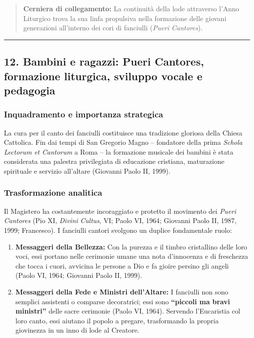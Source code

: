 \documentclass[12pt,a4paper]{article}
\begin{document}
	\begin{quote}
		\textbf{Cerniera di collegamento:} La continuità della lode attraverso l'Anno Liturgico trova la sua linfa propulsiva nella formazione delle giovani generazioni all'interno dei cori di fanciulli (\emph{Pueri Cantores}).
	\end{quote}
	
	\begin{center}\rule{0.5\linewidth}{0.5pt}\end{center}
	
	\subsection{12. Bambini e ragazzi: Pueri Cantores, formazione liturgica, sviluppo vocale e pedagogia}\label{bambini-e-ragazzi-pueri-cantores-formazione-liturgica-sviluppo-vocale-e-pedagogia}
	
	\subsubsection{Inquadramento e importanza strategica}\label{inquadramento-e-importanza-strategica-10}
	
	La cura per il canto dei fanciulli costituisce una tradizione gloriosa della Chiesa Cattolica. Fin dai tempi di San Gregorio Magno -- fondatore della prima \emph{Schola Lectorum et Cantorum} a Roma -- la formazione musicale dei bambini è stata considerata una palestra privilegiata di educazione cristiana, maturazione spirituale e servizio all'altare (Giovanni Paolo II, 1999).
	
	\subsubsection{Trasformazione analitica}\label{trasformazione-analitica-11}
	
	Il Magistero ha costantemente incoraggiato e protetto il movimento dei \emph{Pueri Cantores} (Pio XI, \emph{Divini Cultus}, VI; Paolo VI, 1964; Giovanni Paolo II, 1987, 1999; Francesco). I fanciulli cantori svolgono un duplice fondamentale ruolo:
	
	\begin{enumerate}[label=\arabic*.,leftmargin=*]
		\item \textbf{Messaggeri della Bellezza:} Con la purezza e il timbro cristallino delle loro voci, essi portano nelle cerimonie umane una nota d'innocenza e di freschezza che tocca i cuori, avvicina le persone a Dio e fa gioire persino gli angeli (Paolo VI, 1964; Giovanni Paolo II, 1999).
		\item \textbf{Messaggeri della Fede e Ministri dell'Altare:} I fanciulli non sono semplici assistenti o comparse decoratrici; essi sono \textbf{``piccoli ma bravi ministri''} delle sacre cerimonie (Paolo VI, 1964). Servendo l'Eucaristia col loro canto, essi aiutano il popolo a pregare, trasformando la propria giovinezza in un inno di lode al Creatore.
	\end{enumerate}
	
\end{document}

